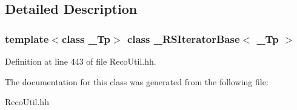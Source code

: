 \subsection{Detailed Description}
\subsubsection*{template$<$class \_\-Tp$>$ class \_\-RSIteratorBase$<$ \_\-Tp $>$}



Definition at line 443 of file RecoUtil.hh.

The documentation for this class was generated from the following file:\begin{DoxyCompactItemize}
\item 
RecoUtil.hh\end{DoxyCompactItemize}
